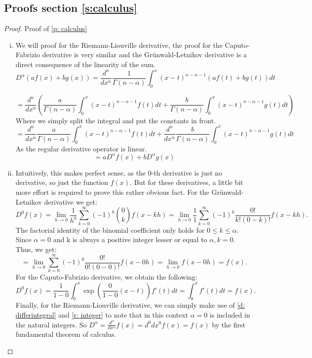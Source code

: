\subsection{Proofs section \ref{s:calculus}}

\begin{proof}
    Proof of \ref{p: calculus}
    \begin{enumerate}[(i)]
        \item We will proof for the Riemann-Liouville derivative, the proof for the Caputo-Fabrizio derivative is very similar and the Grünwald-Letnikov derivative is a direct consequence of the linearity of the sum.
        \[ D^{\alpha} (a f(x) + b g(x)) = \frac{d^n}{dx^n}\frac{1}{\Gamma(n - \alpha)} \int_{0}^{x} (x - t)^{n - \alpha - 1} (a f(t) + b g(t)) dt \]
     
        \[= \frac{d^n}{dx^n}\left(\frac{a}{\Gamma(n - \alpha)} \int_{0}^{x} (x - t)^{n - \alpha - 1}  f(t)dt + \frac{b}{\Gamma(n - \alpha)} \int_{0}^{x} (x - t)^{n - \alpha - 1} g(t)dt\right) \] Where we simply split the integral and put the constants in front.
        \[= \frac{d^n}{dx^n}\frac{a}{\Gamma(n - \alpha)} \int_{0}^{x} (x - t)^{n - \alpha - 1}  f(t)dt + \frac{d^n}{dx^n} \frac{b}{\Gamma(n - \alpha)} \int_{0}^{x} (x - t)^{n - \alpha - 1} g(t)dt \] As the regular derivative operator is linear.
        \[ = a D^{\alpha} f(x) + b D^{\alpha} g(x) \]
        \item Intuitively, this makes perfect sense, as the 0-th derivative is just no derivative, so just the function \(f(x)\). But for these derivatives, a little bit more effort is required to prove this rather obvious fact.
        \newline 
        For the Grünwald-Letnikov derivative we get: \[D^0 f(x) = \lim_{h \to 0} \frac{1}{h^0} \sum_{k=0}^\infty (-1)^k \binom{0}{k} f(x - k h)
        = \lim_{h \to 0} \frac{1}{1} \sum_{k=0}^\infty (-1)^k \frac{0!}{k!(0- k)!} f(x - k h).\] The factorial identity of the binomial coefficient only holds for \(0 \leq k \leq \alpha\). Since \(\alpha = 0\) and k is always a positive integer lesser or equal to \(\alpha, k = 0\). Thus, we get:
        \[ = \lim_{h \to 0} \sum_{k=0}^\infty (-1)^0 \frac{0!}{0!(0- 0)!} f(x - 0 h) = \lim_{h \to 0} f(x - 0 h) = f(x).\]
        \newline
        For the Caputo-Fabrizio derivative, we obtain the following:
        \[ D^{0} f(x) = \frac{1}{1 - 0}  \int_{0}^{x} \exp\left(\frac{0}{1 -0}(x-t)\right) f'(t) dt = \int_{0}^{x}f'(t) dt = f(x).\]
        \newline
        Finally, for the Riemann-Liouville derivative, we can simply make use of \autoref{d: differintegral} and \autoref{r: integer} to note that in this context \(\alpha = 0\) is included in the natural integers. So \(D^\alpha = \frac{d^\alpha}{dx^\alpha} f(x) = {d^0}{dx^0} f(x) = f(x)\) by the first fundamental theorem of calculus.


\end{enumerate}
\end{proof}
